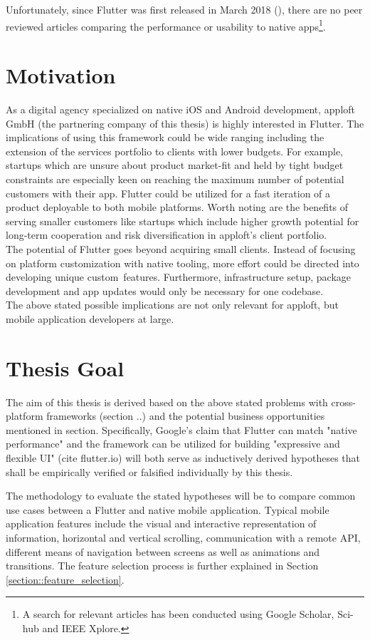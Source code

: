Unfortunately, since Flutter was first released in March 2018 (\cite{FlutterReleases2020}), 
there are no peer reviewed articles comparing the performance or usability to native apps\footnote{A search for relevant articles has been conducted using Google Scholar, Sci-hub and IEEE Xplore.}. 

\section{Motivation}
As a digital agency specialized on native iOS and Android development, apploft GmbH 
(the partnering company of this thesis) is highly interested in Flutter. 
The implications of using this framework could be wide ranging including the extension of the services portfolio
to clients with lower budgets.
For example, startups which are unsure about product market-fit and held by tight budget constraints are especially keen on reaching 
the maximum number of potential customers with their app. Flutter could be utilized for a fast iteration of a product deployable to 
both mobile platforms. 
Worth noting are the benefits of serving smaller customers like startups which include higher growth potential for long-term cooperation
and risk diversification in apploft's client portfolio.\\
The potential of Flutter goes beyond acquiring small clients. Instead of focusing on platform customization with native tooling, more effort could 
be directed into developing unique custom features.
Furthermore, infrastructure setup, package development and app updates would only be necessary for one codebase.\\
The above stated possible implications are not only relevant for apploft, but mobile application developers at large.

\section{Thesis Goal}
The aim of this thesis is derived based on the above stated problems with cross-platform frameworks (section ..) and the potential business opportunities mentioned in section.
Specifically, Google's claim that Flutter can match "native performance" and the framework can be utilized for building "expressive and flexible UI" (cite flutter.io)
will both serve as inductively derived hypotheses that shall be empirically verified or falsified individually by this thesis.


The methodology to evaluate the stated hypotheses will be to compare common use cases between a Flutter and native mobile application.
Typical mobile application features include the visual and interactive representation of information, horizontal and vertical scrolling, 
communication with a remote API, different means of navigation between screens 
as well as animations and transitions.
The feature selection process is further explained in Section \ref{section::feature_selection}.

